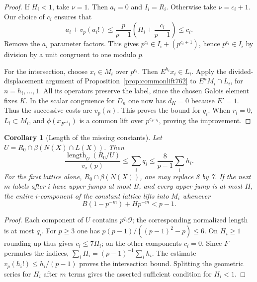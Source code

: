 \documentclass[a4paper,11pt]{article}
\newtheorem{corollary}[proposition]{Corollary}
\theoremstyle{definition}
\theoremstyle{remark}
\numberwithin{equation}{section}
\begin{document}
\begin{proof}
If \(H_i<1\), take \(\nu=1\). Then \(a_i=0\) and
\(I_i=R_i\). Otherwise take \(\nu=c_i+1\).
Our choice of \(c_i\) ensures that
\[
      a_i+v_p(a_i!)\le\frac{p}{p-1}
             \left(H_i+\frac{c_i}{p-1}\right)\le c_i .
\]
Remove the \(a_i\) parameter factors. This gives
\(p^{c_i}\in I_i+(p^{c_i+1})\), hence \(p^{c_i}\in I_i\)
by division by a unit congruent to one modulo \(p\).

For the intersection, choose \(x_i\in M_i\) over
\(p^{c_i}\). Then \(E^{h_i}x_i\in L_i\). Apply the
divided-displacement argument of Proposition~\ref{prop:commonlift762}
to \(E^nM_i\cap L_i\), for \(n=h_i,\ldots,1\).
All its operators preserve the label, since the chosen
Galois element fixes \(K\). In the scalar congruence for
\(D_n\) one now has \(d_K=0\) because \(E'=1\). Thus
the successive costs are \(v_p(n)\). This proves the bound
for \(q_i\). When \(r_i=0\), \(L_i\subset M_i\), and
\(\phi(x_{F^{-1}i})\) is a common lift over
\(p^{c_{F^{-1}i}}\), proving the improvement.
\end{proof}

\begin{corollary}[Length of the missing constants]
\leavevmode\label{cor:orbitconstants764}
Let \(U=R_0\cap\beta(N(X)\cap L(X))\). Then
\[
        \frac{\operatorname{length}_{\mathcal O}(R_0/U)}
             {v_\pi(p)}
          \le \sum_i q_i
          \le \frac{8}{p-1}\sum_i h_i .
\]
For the first lattice alone, \(R_0\cap\beta(N(X))\),
one may replace 8 by 7. If the next \(m\) labels after
\(i\) have upper jumps at most \(B\), and every upper jump
is at most \(H\), the entire \(i\)-component of the
constant lattice lifts into \(M_i\) whenever
\[
               B(1-p^{-m})+H p^{-m}<p-1 .
\]
\end{corollary}
\begin{proof}
Each component of \(U\) contains \(p^{q_i}\mathcal O\);
the corresponding normalized length is at most \(q_i\).
For \(p\ge3\) one has
\(p(p-1)/((p-1)^2-p)\le6\). On \(H_i\ge1\) rounding up
thus gives \(c_i\le7H_i\); on the other components \(c_i=0\).
Since \(F\) permutes the indices,
\(\sum_i H_i=(p-1)^{-1}\sum_i h_i\). The estimate
\(v_p(h_i!)\le h_i/(p-1)\) proves the intersection bound.
Splitting the geometric series for \(H_i\) after \(m\)
terms gives the asserted sufficient condition for \(H_i<1\).
\end{proof}
\end{document}
